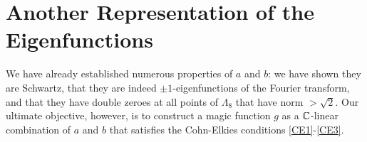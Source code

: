 \section{Another Representation of the Eigenfunctions}

We have already established numerous properties of $a$ and $b$: we have shown they are Schwartz, that they are indeed $\pm1$-eigenfunctions of the Fourier transform, and that they have double zeroes at all points of $\Lambda_8$ that have norm $> \sqrt{2}$. Our ultimate objective, however, is to construct a magic function $g$ as a $\mathbb{C}$-linear combination of $a$ and $b$ that satisfies the Cohn-Elkies conditions \ref{CE1}-\ref{CE3}.